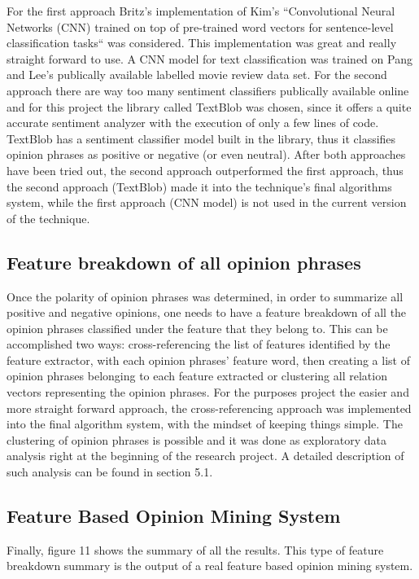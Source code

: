 \documentclass{sig-alternate}
\begin{document}
For the first approach Britz's implementation\cite{Britz2017} of Kim's ``Convolutional Neural Networks (CNN) trained on top of pre-trained word vectors for sentence-level classification tasks``\cite{Kim2014}  was considered. This implementation was great and really straight forward to use. A CNN model for text classification was trained on Pang and Lee's publically available labelled movie review data set\cite{PangLee2004}. 
For the second approach there are way too many sentiment classifiers publically available online and for this project the library called TextBlob\cite{Loria2017} was chosen, since it offers a quite accurate sentiment analyzer with the execution of only a few lines of code. TextBlob has a sentiment classifier model built in the library, thus it classifies opinion phrases as positive or negative (or even neutral).
After both approaches have been tried out, the second approach outperformed the first approach, thus the second approach (TextBlob) made it into the technique's final algorithms system, while the first approach (CNN model) is not used in the current version of the technique.

\subsection{Feature breakdown of all opinion phrases}
Once the polarity of opinion phrases was determined, in order to summarize all positive and negative opinions, one needs to have a feature breakdown of all the opinion phrases classified under the feature that they belong to. This can be accomplished two ways: cross-referencing the list of features identified by the feature extractor, with each opinion phrases' feature word, then creating a list of opinion phrases belonging to each feature extracted or clustering all relation vectors representing the opinion phrases. For the purposes project the easier and more straight forward approach, the cross-referencing approach was implemented into the final algorithm system, with the mindset of keeping things simple. The clustering of opinion phrases is possible and it was done as exploratory data analysis right at the beginning of the research project. A detailed description of such analysis can be found in section 5.1. 

\subsection{Feature Based Opinion Mining System}
Finally, figure 11 shows the summary of all the results. This type of feature breakdown summary is the output of a real feature based opinion mining system.
\end{document}
